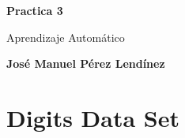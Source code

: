 \documentclass[titlepage]{article}
\begin{document}
	\begin{titlepage}
		\begin{center}
			\vspace*{1cm}
			\date{} %
			\Huge
			\textbf{Practica 3}
			
			\vspace{0.5cm}
			\LARGE
			Aprendizaje Automático
			
			\vspace{1.5cm}
			
			\textbf{José Manuel Pérez Lendínez}
			

			
		\end{center}
	\newpage
	\tableofcontents
	\newpage
	\end{titlepage}

	\section{Digits Data Set}	
\end{document}
